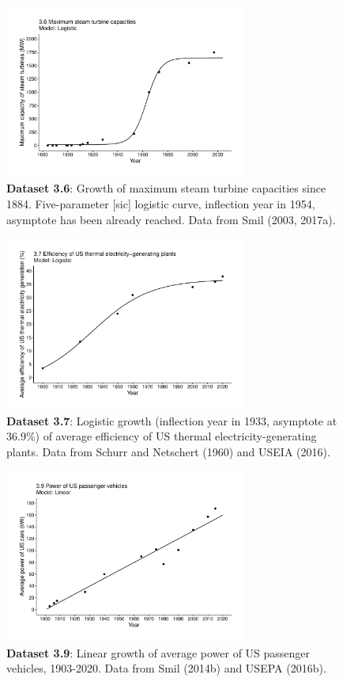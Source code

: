 \documentclass[aps,rmp,preprint,superscriptaddress,10pt,onecolumn]{article}
\begin{document}
\begin{figure}[h]
\includegraphics[width=8cm]{output/figs-ggplot/3.6.pdf}
\caption{\textbf{Dataset 3.6}: Growth of maximum steam turbine capacities since 1884. Five-parameter [sic] logistic curve, inflection year in 1954, asymptote has been already reached. Data from Smil (2003, 2017a).}
\end{figure}
	
\begin{figure}[h]
\includegraphics[width=8cm]{output/figs-ggplot/3.7.pdf}
\caption{\textbf{Dataset 3.7}: Logistic growth (inflection year in 1933, asymptote at 36.9\%) of average efficiency of US thermal electricity-generating plants. Data from Schurr and Netschert (1960) and USEIA (2016).}
\end{figure}
	
\begin{figure}[h]
\includegraphics[width=8cm]{output/figs-ggplot/3.9.pdf}
\caption{\textbf{Dataset 3.9}: Linear growth of average power of US passenger vehicles, 1903-2020. Data from Smil (2014b) and USEPA (2016b).}
\end{figure}
	
\end{document}
